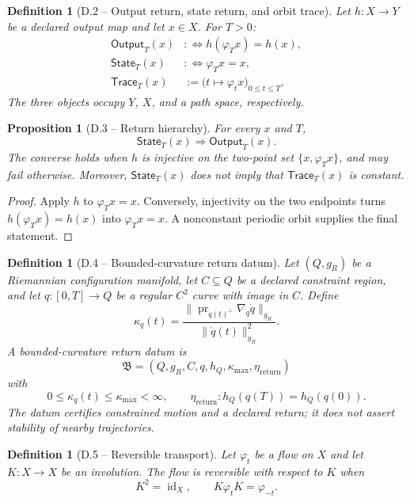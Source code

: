 \documentclass[11pt,letterpaper]{article}
\theoremstyle{dynamicsstyle}
\newtheorem{proposition}[theorem]{Proposition}
\newtheorem{definition}[theorem]{Definition}
\newcommand{\id}{\operatorname{id}}
\newcommand{\pr}{\operatorname{pr}}
\newcommand{\Flow}{\varphi}
\newcommand{\State}{\mathsf{State}}
\newcommand{\Output}{\mathsf{Output}}
\newcommand{\Trace}{\mathsf{Trace}}
\begin{document}
\begin{definition}[D.2 -- Output return, state return, and orbit trace]\label{def:return}
Let $h:X\to Y$ be a declared output map and let $x\in X$.
For $T>0$:
\begin{align*}
\Output_T(x)&:\Longleftrightarrow h(\Flow_Tx)=h(x),\\
\State_T(x)&:\Longleftrightarrow \Flow_Tx=x,\\
\Trace_T(x)&:=\bigl(t\mapsto\Flow_tx\bigr)_{0\le t\le T}.
\end{align*}
The three objects occupy $Y$, $X$, and a path space, respectively.
\end{definition}

\begin{proposition}[D.3 -- Return hierarchy]\label{prop:return-hierarchy}
For every $x$ and $T$,
\[
\State_T(x)\Longrightarrow\Output_T(x).
\]
The converse holds when $h$ is injective on the two-point set $\{x,\Flow_Tx\}$, and may fail otherwise.  Moreover, $\State_T(x)$ does not imply that $\Trace_T(x)$ is constant.
\end{proposition}

\begin{proof}
Apply $h$ to $\Flow_Tx=x$.  Conversely, injectivity on the two endpoints turns $h(\Flow_Tx)=h(x)$ into $\Flow_Tx=x$.  A nonconstant periodic orbit supplies the final statement.
\end{proof}

\begin{definition}[D.4 -- Bounded-curvature return datum]\label{def:bounded-return}
Let $(Q,g_R)$ be a Riemannian configuration manifold, let $C\subseteq Q$ be a declared constraint region, and let $q:[0,T]\to Q$ be a regular $C^2$ curve with image in $C$.  Define
\[
\kappa_q(t)=
\frac{\bigl\|\pr_{\dot q(t)^\perp}\nabla_{\dot q}\dot q\bigr\|_{g_R}}
     {\|\dot q(t)\|_{g_R}^2}.
\]
A bounded-curvature return datum is
\[
\mathfrak B=(Q,g_R,C,q,h_Q,\kappa_{\max},\eta_{\mathrm{return}})
\]
with
\[
0\le\kappa_q(t)\le\kappa_{\max}<\infty,
\qquad
\eta_{\mathrm{return}}:h_Q(q(T))=h_Q(q(0)).
\]
The datum certifies constrained motion and a declared return; it does not assert stability of nearby trajectories.
\end{definition}

\begin{definition}[D.5 -- Reversible transport]
Let $\Flow_t$ be a flow on $X$ and let $K:X\to X$ be an involution.  The flow is reversible with respect to $K$ when
\[
K^2=\id_X,
\qquad
K\Flow_tK=\Flow_{-t}.
\]
\end{definition}
\end{document}
